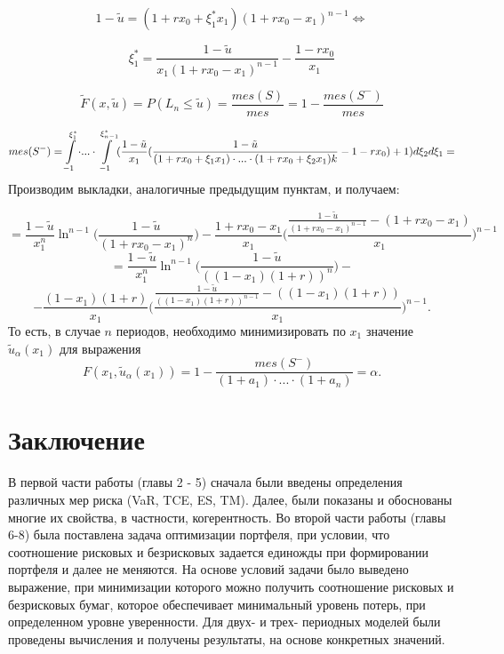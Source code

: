 \documentclass[14pt,a4paper]{article}
\theoremstyle{plain}
\theoremstyle{definition}
\begin{document}
$$
1-\tilde{u} = (1+rx_0 + \xi^*_1 x_1)  (1+rx_0- x_1)^{n-1} \Longleftrightarrow
$$

$$
\xi^*_1 = \frac{1-\tilde{u}}{x_1(1+rx_0- x_1)^{n-1}} -\frac{1 - rx_0}{x_1}
$$

$$
\tilde{F}(x,\tilde{u})=P(L_n \le \tilde{u}) = \frac{mes(S)}{mes} = 1 - \frac{mes(S^-)}{mes}
$$


$$
mes(S^-) = \int\displaylimits_{-1}^{\xi_1^*} \cdot ... \cdot   \int\displaylimits_{-1}^{\xi_{n-1}^*} (\frac{1-\tilde{u}}{x_1} (\frac{1-\tilde{u}}{(1+rx_0+\xi_1 x_1)\cdot ... \cdot (1+rx_0+\xi_2 x_1)k} -1 -rx_0)+1 )d\xi_2 d\xi_1 =
$$
Производим выкладки, аналогичные предыдущим пунктам, и получаем:

$$
= \frac{1-\tilde{u}}{x_1^n} \ln^{n-1}\Bigg(\frac{1-\tilde{u}}{(1+rx_0-x_1)^n}\Bigg)-\frac{1+rx_0-x_1}{x_1}\Bigg(\frac{\frac{1-\tilde{u}}{(1+rx_0- x_1)^{n-1}} - (1 + rx_0-x_1)}{x_1}\Bigg)^{n-1}
$$
$$
= \frac{1-\tilde{u}}{x_1^n} \ln^{n-1}\Bigg(\frac{1-\tilde{u}}{((1-x_1)(1+r))^n}\Bigg)-$$
$$-\frac{(1-x_1)(1+r)}{x_1}\Bigg(\frac{\frac{1-\tilde{u}}{((1-x_1)(1+r))^{n-1}} - ((1-x_1)(1+r))}{x_1}\Bigg)^{n-1}.
$$
То есть, в случае $n$ периодов, необходимо минимизировать по $x_1$ значение $\tilde{u}_\alpha(x_1)$ для выражения
$$
F(x_1,\tilde{u}_\alpha(x_1))=1-\frac{mes(S^-)}{(1+a_1)\cdot ... \cdot(1+a_n)} = \alpha.
$$
\newpage
 \section{Заключение}

В первой части работы (главы 2 - 5) сначала были введены определения различных мер риска (VaR, TCE, ES, TM). Далее, были показаны и обоснованы многие их свойства, в частности, когерентность.
Во второй части работы (главы 6-8) была поставлена задача оптимизации портфеля, при условии, что соотношение рисковых и безрисковых задается единожды при формировании портфеля и далее не меняются.
На основе условий задачи было выведено выражение, при минимизации которого можно получить соотношение рисковых и безрисковых бумаг, которое обеспечивает минимальный уровень потерь,
при определенном уровне уверенности.
Для двух- и трех- периодных моделей были проведены вычисления и получены результаты, на основе конкретных значений.


\newpage
\end{document}
